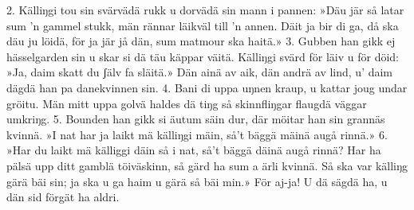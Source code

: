 2.  Källiŋgi tou sin svärvädä rukk
    u dorvädä sin mann i pannen:
    »Däu jär så latar sum ’n gammel stukk,
    män rännar läikväl till ’n annen.
    Däit ja bir di ga, då ska däu ju löidä,
    för ja jär jå dän, sum matmour ska haitä.»
3.  Gubben han gikk ej hässelgarden sin
    u skar si dä täu käppar väitä.
    Källiŋgi svärd för läiv u för döid:
    »Ja, daim skatt du ʃälv fa släitä.»
    Dän ainä av aik, dän andrä av lind,
    u’ daim dägdä han pa danekvinnen sin.
4.  Bani di uppa uŋnen kraup,
    u kattar joug undar gröitu.
    Män mitt uppa golvä haldes dä tiŋg
    så skinnfliŋgar flaugdä väggar umkriŋg.
5.  Bounden han gikk si äutum säin dur,
    där möitar han sin grannäs kvinnä.
    »I nat har ja laikt mä källiŋgi mäin,
    så’t bäggä mäinä augå rinnä.»
6.  »Har du laikt mä källiggi däin så i nat,
    så’t bäggä däinä augå rinnä?
    Har ha pälsä upp ditt gamblä töiväskinn,
    så gärd ha sum a ärli kvinnä.
    Så ska var källiŋg gärä bäi sin;
    ja ska u ga haim u gärä så bäi min.»
    För aj-ja! U dä sägdä ha, u dän sid förgät ha aldri.

